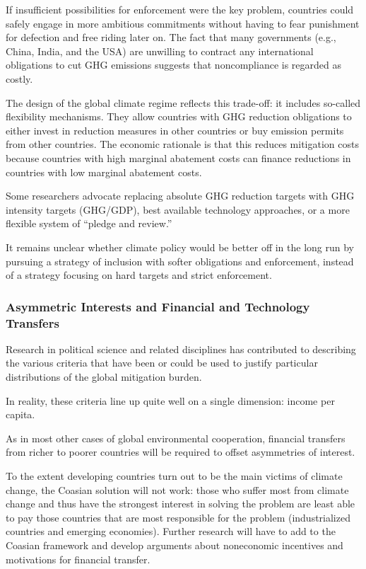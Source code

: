 If insufficient possibilities for enforcement were the key problem, countries could safely engage in more ambitious commitments without having to fear punishment for defection and free riding later on. The fact that many governments (e.g., China, India, and the USA) are unwilling to contract any international obligations to cut GHG emissions suggests that noncompliance is regarded as costly.

The design of the global climate regime reflects this trade-off: it includes so-called flexibility mechanisms. They allow countries with GHG reduction obligations to either invest in reduction measures in other countries or buy emission permits from other countries. The economic rationale is that this reduces mitigation costs because countries with high marginal abatement costs can finance reductions in countries with low marginal abatement costs.

Some researchers advocate replacing absolute GHG reduction targets with GHG intensity targets (GHG/GDP), best available technology approaches, or a more flexible system of “pledge and review.”

It remains unclear whether climate policy would be better off in the long run by pursuing a strategy of inclusion with softer obligations and enforcement, instead of a strategy focusing on hard targets and strict enforcement.

\subsubsection{Asymmetric Interests and Financial and Technology Transfers}

Research in political science and related disciplines has contributed to describing the various criteria that have been or could be used to justify particular distributions of the global mitigation burden.

In reality, these criteria line up quite well on a single dimension: income per capita.

As in most other cases of global environmental cooperation, financial transfers from richer to poorer countries will be required to offset asymmetries of interest.

To the extent developing countries turn out to be the main victims of climate change, the Coasian solution will not work: those who suffer most from climate change and thus have the strongest interest in solving the problem are least able to pay those countries that are most responsible for the problem (industrialized countries and emerging economies). Further research will have to add to the Coasian framework and develop arguments about noneconomic incentives and motivations for financial transfer.

